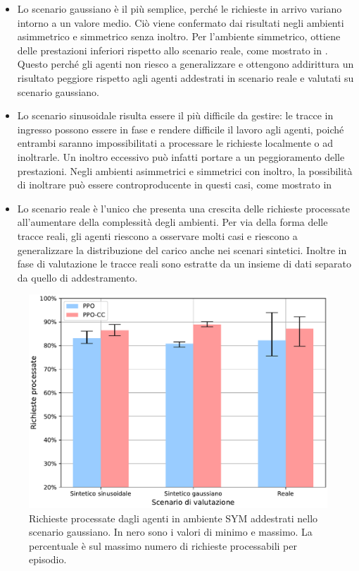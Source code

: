 \begin{itemize}
    \item Lo scenario gaussiano è il più semplice, perché le richieste in arrivo variano intorno a un valore medio. Ciò viene confermato dai risultati negli ambienti asimmetrico e simmetrico senza inoltro. Per l'ambiente simmetrico, ottiene delle prestazioni inferiori rispetto allo scenario reale, come mostrato in . Questo perché gli agenti non riesco a generalizzare e ottengono addirittura un risultato peggiore rispetto agli agenti addestrati in scenario reale e valutati su scenario gaussiano.

    \item Lo scenario sinusoidale risulta essere il più difficile da gestire: le tracce in ingresso possono essere in fase e rendere difficile il lavoro agli agenti, poiché entrambi saranno impossibilitati a processare le richieste localmente o ad inoltrarle. Un inoltro eccessivo può infatti portare a un peggioramento delle prestazioni. Negli ambienti asimmetrici e simmetrici con inoltro, la possibilità di inoltrare può essere controproducente in questi casi, come mostrato in 

    \item Lo scenario reale è l'unico che presenta una crescita delle richieste processate all'aumentare della complessità degli ambienti. Per via della forma delle tracce reali, gli agenti riescono a osservare molti casi e riescono a generalizzare la distribuzione del carico anche nei scenari sintetici. Inoltre in fase di valutazione le tracce reali sono estratte da un insieme di dati separato da quello di addestramento. 
\end{itemize}

\begin{figure}
    \centering
    \includegraphics[width=.6\linewidth]{assets/5/results/eval_SYM_train_synthetic-normal_processed_requests.pdf}
    \caption[Richieste processate dagli agenti in ambiente SYM addestrati nello scenario gaussiano]{Richieste processate dagli agenti in ambiente SYM addestrati nello scenario gaussiano. In nero sono i valori di minimo e massimo. La percentuale è sul massimo numero di richieste processabili per episodio.}
    \label{fig:5_eval_sym_train_normal_requests}
\end{figure}

